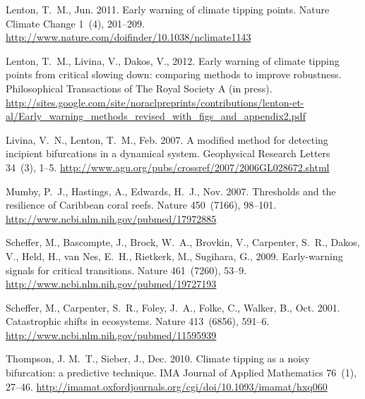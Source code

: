 \documentclass[authoryear,review,12pt]{elsarticle}
\begin{document}
\begin{thebibliography}{24}
Lenton, T.~M., Jun. 2011. {Early warning of climate tipping points}. Nature
  Climate Change 1~(4), 201--209.
\newline\urlprefix\url{http://www.nature.com/doifinder/10.1038/nclimate1143}

Lenton, T.~M., Livina, V., Dakos, V., 2012. {Early warning of climate tipping
  points from critical slowing down: comparing methods to improve robustness}.
  Philosophical Transactions of The Royal Society A (in press).
\newline\urlprefix\url{http://sites.google.com/site/noraclpreprints/contributions/lenton-et-al/Early\_warning\_methods\_revised\_with\_figs\_and\_appendix2.pdf}

Livina, V.~N., Lenton, T.~M., Feb. 2007. {A modified method for detecting
  incipient bifurcations in a dynamical system}. Geophysical Research Letters
  34~(3), 1--5.
\newline\urlprefix\url{http://www.agu.org/pubs/crossref/2007/2006GL028672.shtml}

Mumby, P.~J., Hastings, A., Edwards, H.~J., Nov. 2007. {Thresholds and the
  resilience of Caribbean coral reefs.} Nature 450~(7166), 98--101.
\newline\urlprefix\url{http://www.ncbi.nlm.nih.gov/pubmed/17972885}

Scheffer, M., Bascompte, J., Brock, W.~A., Brovkin, V., Carpenter, S.~R.,
  Dakos, V., Held, H., van Nes, E.~H., Rietkerk, M., Sugihara, G., 2009.
  {Early-warning signals for critical transitions.} Nature 461~(7260), 53--9.
\newline\urlprefix\url{http://www.ncbi.nlm.nih.gov/pubmed/19727193}

Scheffer, M., Carpenter, S.~R., Foley, J.~A., Folke, C., Walker, B., Oct. 2001.
  {Catastrophic shifts in ecosystems.} Nature 413~(6856), 591--6.
\newline\urlprefix\url{http://www.ncbi.nlm.nih.gov/pubmed/11595939}

Thompson, J. M.~T., Sieber, J., Dec. 2010. {Climate tipping as a noisy
  bifurcation: a predictive technique}. IMA Journal of Applied Mathematics
  76~(1), 27--46.
\newline\urlprefix\url{http://imamat.oxfordjournals.org/cgi/doi/10.1093/imamat/hxq060}


\end{thebibliography}
\end{document}
